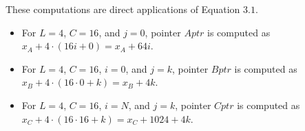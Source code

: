 \documentclass{article}
\begin{document}
These computations are direct applications of Equation $3.1$.
\begin{itemize}
	\item For $L=4$, $C=16$, and $j=0$, pointer $Aptr$ is computed as
	$x_A+4\cdot(16i+0) = x_A+64i$.
	\item For $L=4$, $C=16$, $i=0$, and $j=k$, pointer $Bptr$ is computed as
	$x_B+4\cdot(16\cdot0+k) = x_B+4k$.
	\item For $L=4$, $C=16$, $i=N$, and $j=k$, pointer $Cptr$ is computed as
	$x_C+4\cdot(16\cdot16+k) = x_C+1024+4k$.
\end{itemize}
\end{document}

